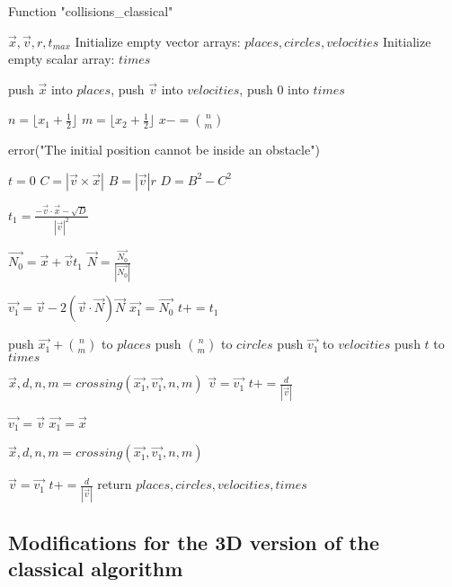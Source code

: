 \documentclass{iopart}
\begin{document}
\begin{algorithm}
\caption{Function "collisions\_classical"}
\label{alg:collisions\_classical}
\begin{algorithmic}
 {$\vec{x}, \vec{v}, r, t_{max}$}
\State     Initialize empty vector arrays: $places, circles, velocities$
\State     Initialize empty scalar array: $times$
	
\State     push $\vec{x}$ into $places$, push $\vec{v}$ into $velocities$, push 0 into $times$

\State	$n = \lfloor x_1 + \frac{1}{2} \rfloor$
\State	$m = \lfloor x_2 + \frac{1}{2} \rfloor$
\State	$x -= \binom{n}{m}$
	
\State		error("The initial position cannot be inside an obstacle")
	\EndIf

\State	$t = 0$
\State		$C = | \vec{v} \times \vec{x}|$
\State		$B = |\vec{v}| r$
\State		$D = B^2 - C^2$
		
\State			$t_1 = \frac{-\vec{v} \cdot \vec{x} - \sqrt{D}}{|\vec{v}|^2}$
			
\State			$\vec{N_0} = \vec{x} + \vec{v} t_1$
\State			$\vec{N} = \frac{\vec{N_0}}{|\vec{N_0}|}$
			
\State		    $\vec{v_1} = \vec{v} - 2 (\vec{v} \cdot \vec{N}) \vec{N}$
\State			$\vec{x_1} = \vec{N_0}$
\State			$t += t_1$
			
\State			push $\vec{x_1} + \binom{n}{m}$ to $places$
\State			push $\binom{n}{m}$ to $circles$
\State			push $\vec{v_1}$ to $velocities$
\State			push $t$ to $times$
			
\State			$\vec{x}, d, n, m = crossing(\vec{x_1}, \vec{v_1}, n, m)$
\State			$\vec{v} = \vec{v_1}$
\State			$t += \frac{d}{|\vec{v}|}$
			
		\Else
\State			$\vec{v_1} = \vec{v}$
\State			$\vec{x_1} = \vec{x}$

\State			$\vec{x}, d, n, m = crossing(\vec{x_1}, \vec{v_1}, n, m)$

\State			$\vec{v} = \vec{v_1}$
\State			$t += \frac{d}{|\vec{v}|}$
		\EndIf
	\EndWhile
\State	return $places, circles, velocities, times$
\EndFunction
\end{algorithmic}
\end{algorithm}


\subsection{Modifications for the 3D version of the classical algorithm}
\end{document}
